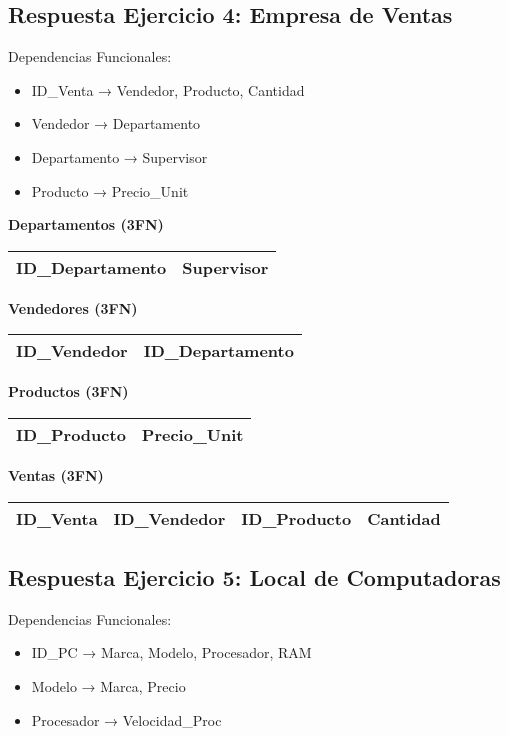 \documentclass[12pt]{article}
\begin{document}
\subsection{Respuesta Ejercicio 4: Empresa de Ventas}

Dependencias Funcionales:
\begin{itemize}
    \item ID\_Venta → Vendedor, Producto, Cantidad
    \item Vendedor → Departamento
    \item Departamento → Supervisor
    \item Producto → Precio\_Unit
\end{itemize}

\textbf{Departamentos (3FN)}
\begin{center}
\begin{tabular}{|l|l|}
\hline
ID\_Departamento & Supervisor \\
\hline
\end{tabular}
\end{center}

\textbf{Vendedores (3FN)}
\begin{center}
\begin{tabular}{|l|l|}
\hline
ID\_Vendedor & ID\_Departamento \\
\hline
\end{tabular}
\end{center}

\textbf{Productos (3FN)}
\begin{center}
\begin{tabular}{|l|l|}
\hline
ID\_Producto & Precio\_Unit \\
\hline
\end{tabular}
\end{center}

\textbf{Ventas (3FN)}
\begin{center}
\begin{tabular}{|l|l|l|l|}
\hline
ID\_Venta & ID\_Vendedor & ID\_Producto & Cantidad \\
\hline
\end{tabular}
\end{center}

\subsection{Respuesta Ejercicio 5: Local de Computadoras}

Dependencias Funcionales:
\begin{itemize}
    \item ID\_PC → Marca, Modelo, Procesador, RAM
    \item Modelo → Marca, Precio
    \item Procesador → Velocidad\_Proc
\end{itemize}
\end{document}
